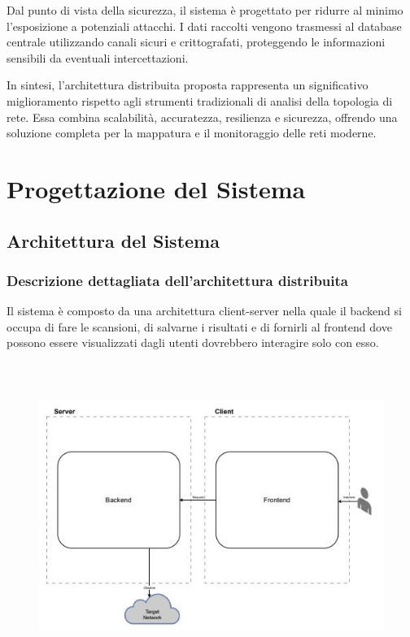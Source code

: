 \documentclass[target=bach,aauheader=,style=]{thud}
\begin{document}
Dal punto di vista della sicurezza, il sistema è progettato per ridurre al minimo l'esposizione a potenziali attacchi. I dati raccolti vengono trasmessi al database centrale utilizzando canali sicuri e crittografati, proteggendo le informazioni sensibili da eventuali intercettazioni.

In sintesi, l'architettura distribuita proposta rappresenta un significativo miglioramento rispetto agli strumenti tradizionali di analisi della topologia di rete. Essa combina scalabilità, accuratezza, resilienza e sicurezza, offrendo una soluzione completa per la mappatura e il monitoraggio delle reti moderne.

\chapter{Progettazione del Sistema}
\section{Architettura del Sistema}
\subsection{Descrizione dettagliata dell'architettura distribuita}
Il sistema è composto da una architettura client-server nella quale il backend si occupa di fare le scansioni, di salvarne i risultati e di fornirli al frontend dove possono essere visualizzati dagli utenti dovrebbero interagire solo con esso. 


\begin{figure}[h]
  \includegraphics[width=15cm, height=10cm]{client_server}
  \centering
\end{figure}
\end{document}
